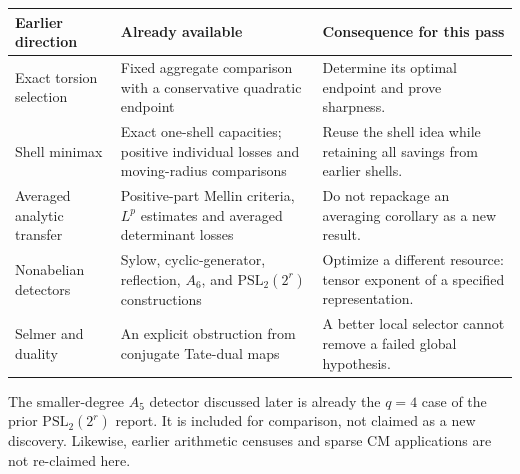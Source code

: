 \begin{center}
\small
\begin{tabularx}{\textwidth}{@{}p{}XX@{}}
\toprule
Earlier direction & Already available & Consequence for this pass\\
\midrule
Exact torsion selection & Fixed aggregate comparison with a conservative quadratic endpoint \cite{exactprior} & Determine its optimal endpoint and prove sharpness.\\
Shell minimax & Exact one-shell capacities; positive individual losses and moving-radius comparisons \cite{shellprior,samplingprior} & Reuse the shell idea while retaining all savings from earlier shells.\\
Averaged analytic transfer & Positive-part Mellin criteria, \(L^p\) estimates and averaged determinant losses \cite{meanprior} & Do not repackage an averaging corollary as a new result.\\
Nonabelian detectors & Sylow, cyclic-generator, reflection, \(A_6\), and \(\mathrm{PSL}_2(2^r)\) constructions \cite{sylowprior,cyclicprior,pslprior} & Optimize a different resource: tensor exponent of a specified representation.\\
Selmer and duality & An explicit obstruction from conjugate Tate-dual maps \cite{structuralprior} & A better local selector cannot remove a failed global hypothesis.\\
\bottomrule
\end{tabularx}
\end{center}

The smaller-degree \(A_5\) detector discussed later is already the \(q=4\) case of the prior \(\mathrm{PSL}_2(2^r)\) report. It is included for comparison, not claimed as a new discovery. Likewise, earlier arithmetic censuses and sparse CM applications are not re-claimed here.

